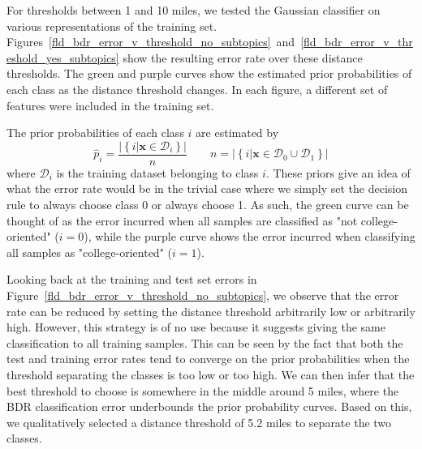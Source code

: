 \documentclass[10pt,twocolumn,letterpaper]{article}
\begin{document}
For thresholds between 1 and 10 miles, we tested the Gaussian classifier on
various representations of the training set.
Figures~\ref{fld_bdr_error_v_threshold_no_subtopics}~and~\ref{fld_bdr_error_v_threshold_yes_subtopics}
show the resulting error rate over these distance thresholds. The green and
purple curves show the estimated prior probabilities of each class as the
distance threshold changes. In each figure, a different set of features were
included in the training set.

The prior probabilities of each class $i$ are estimated by
\[
  \hat{p}_{i}=\frac{\left|\left\{ i|\mathbf{x}\in\mathcal{D}_{i}\right\} \right|}{n}\qquad n=\left|\left\{ i|\mathbf{x}\in\mathcal{D}_{0}\cup\mathcal{D}_{1}\right\} \right|
\]
where $\mathcal{D}_{i}$ is the training dataset belonging to class $i$. These
priors give an idea of what the error rate would be in the trivial case where we
simply set the decision rule to always choose class 0 or always choose 1. As
such, the green curve can be thought of as the error incurred when all samples
are classified as "not college-oriented" ($i=0$), while the purple curve shows
the error incurred when classifying all samples as "college-oriented" ($i=1$).

Looking back at the training and test set errors in
Figure~\ref{fld_bdr_error_v_threshold_no_subtopics}, we observe that the error
rate can be reduced by setting the distance threshold arbitrarily low or
arbitrarily high. However, this strategy is of no use because it suggests giving
the same classification to all training samples. This can be seen by the fact
that both the test and training error rates tend to converge on the prior
probabilities when the threshold separating the classes is too low or too high.
We can then infer that the best threshold to choose is somewhere in the middle
around 5 miles, where the BDR classification error underbounds the prior
probability curves. Based on this, we qualitatively selected a distance
threshold of 5.2 miles to separate the two classes.
\end{document}
